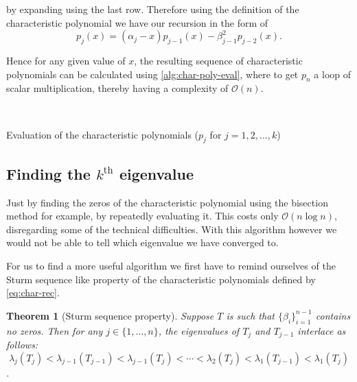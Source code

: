 \documentclass{article}
\newtheorem{theorem}{Theorem}
\begin{document}
by expanding using the last row. Therefore using the definition of the characteristic polynomial we have our recursion in the form of 
\begin{equation}\label{eq:char-rec}
	p_j(x) = (\alpha_j - x)p_{j-1} (x) - \beta_{j-1}^2
	p_{j-2}(x).
\end{equation}

Hence for any given value of $x$, the resulting sequence of characteristic polynomials can be calculated using \autoref{alg:char-poly-eval}, where to get $p_n$ a loop of scalar multiplication, thereby having a complexity of $\mathcal{O}(n)$.

\begin{algorithm2e}[ht]
	
	\SetAlgoLined
	\\
	\caption{Evaluation of the characteristic polynomials ($p_j$ for $j=1,2,\dots,k$)}\label{alg:char-poly-eval}
\end{algorithm2e}


\subsection{Finding the $k^{\mathrm{th}}$ eigenvalue}

Just by finding the zeros of the characteristic polynomial using the bisection method for example, by repeatedly evaluating it. This costs only $\mathcal{O}(n\log{n})$, disregarding some of the technical difficulties. With this algorithm however we would not be able to tell which eigenvalue we have converged to. 

For us to find a more useful algorithm we first have to remind ourselves of the Sturm sequence like property of the characteristic polynomials defined by
 \autoref{eq:char-rec}.
 \begin{theorem}[Sturm sequence property]
 	Suppose $T$ is such that $\{\beta_i\}_{i=1}^{n-1}$ contains no zeros. Then for any $j \in \{1,\ldots,n\}$, the eigenvalues of $T_j$ and $T_{j-1}$ interlace as follows:
 	$$\lambda_j(T_j) <\lambda_{j-1}(T_{j-1}) < \lambda_{j-1}(T_j) <\cdots< \lambda_2(T_j) <\lambda_1(T_{j-1}) < \lambda_1(T_j)$$.
 \end{theorem}
 
\end{document}
